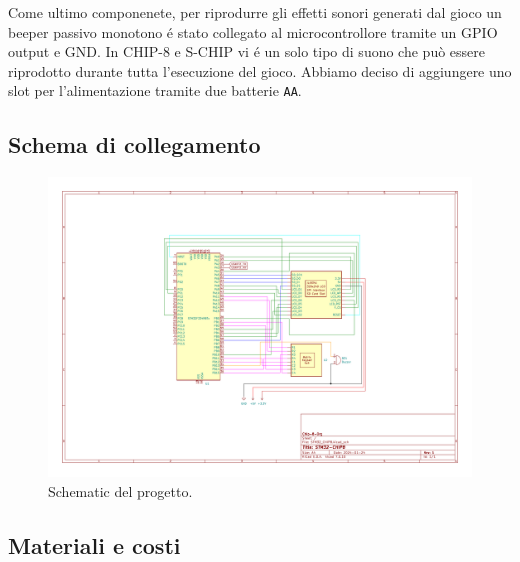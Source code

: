 \documentclass[a4paper]{article}
\begin{document}
Come ultimo componenete, per riprodurre gli effetti sonori generati dal gioco
un beeper passivo monotono é stato collegato al microcontrollore tramite un
GPIO output e GND. In CHIP-8 e S-CHIP vi é un solo tipo di suono che può
essere riprodotto durante tutta l'esecuzione del gioco.
Abbiamo deciso di aggiungere uno slot per l'alimentazione tramite
due batterie \texttt{AA}.

\subsection{Schema di collegamento}

\begin{figure}[h]
    \begin{center}
        \includegraphics[scale=0.50]{figures/STM32_CHIP8.pdf}
    \end{center}
    \caption{Schematic del progetto.}
    \label{fig:schematic}
\end{figure}




\subsection{Materiali e costi} %
\end{document}
